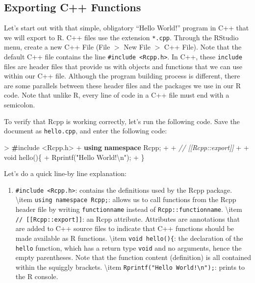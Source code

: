 \documentclass[]{krantz}
\makeatletter
\newenvironment{Shaded}{\begin{snugshade}}{\end{snugshade}}
\newcommand{\KeywordTok}[1]{\textcolor[rgb]{0.27,0.27,0.27}{\textbf{#1}}}
\newcommand{\DataTypeTok}[1]{\textcolor[rgb]{0.27,0.27,0.27}{#1}}
\newcommand{\SpecialCharTok}[1]{\textcolor[rgb]{0,0,0}{#1}}
\newcommand{\StringTok}[1]{\textcolor[rgb]{0.5,0.5,0.5}{#1}}
\newcommand{\CommentTok}[1]{\textcolor[rgb]{0.37,0.37,0.37}{\textit{#1}}}
\newcommand{\ErrorTok}[1]{\textcolor[rgb]{0.14,0.14,0.14}{\textbf{#1}}}
\newcommand{\NormalTok}[1]{#1}
\providecommand{\tightlist}{%
  \setlength{\itemsep}{0pt}\setlength{\parskip}{0pt}}
\newenvironment{kframe}{%
\medskip{}
\setlength{\fboxsep}{.8em}
 \def\at@end@of@kframe{}%
 \ifinner\ifhmode%
  \def\at@end@of@kframe{\end{minipage}}%
  \begin{minipage}{\columnwidth}%
 \fi\fi%
 \def\FrameCommand##1{\hskip\@totalleftmargin \hskip-\fboxsep
 \colorbox{shadecolor}{##1}\hskip-\fboxsep
     \hskip-\linewidth \hskip-\@totalleftmargin \hskip\columnwidth}%
 \MakeFramed {\advance\hsize-\width
   \@totalleftmargin\z@ \linewidth\hsize
   \@setminipage}}%
 {\par\unskip\endMakeFramed%
 \at@end@of@kframe}
\renewenvironment{Shaded}{\begin{kframe}}{\end{kframe}}
\makeatother
\begin{document}
\subsection{Exporting C++ Functions}\label{exporting-c-functions}

Let's start out with that simple, obligatory ``Hello World!'' program in
C++ that we will export to R. C++ files use the extension
\texttt{*.cpp}. Through the RStudio menu, create a new C++ File (File
\(>\) New File \(>\) C++ File). Note that the default C++ file contains
the line \texttt{\#include\ \textless{}Rcpp.h\textgreater{}}. In C++,
these \texttt{include} files are header files that provide us with
objects and functions that we can use within our C++ file. Although the
program building process is different, there are some parallels between
these header files and the packages we use in our R code. Note that
unlike R, every line of code in a C++ file must end with a semicolon.

To verify that Rcpp is working correctly, let's run the following code.
Save the document as \texttt{hello.cpp}, and enter the following code:

\begin{Shaded}
\begin{Highlighting}[]
\NormalTok{> }\ErrorTok{#}\NormalTok{include <Rcpp.h>}
\NormalTok{+ }\KeywordTok{using} \KeywordTok{namespace}\NormalTok{ Rcpp;}
\NormalTok{+ }
\NormalTok{+ }\CommentTok{// [[Rcpp::export]]}
\NormalTok{+ }
\NormalTok{+ }\DataTypeTok{void}\NormalTok{ hello()\{}
\NormalTok{+   Rprintf(}\StringTok{"Hello World!}\SpecialCharTok{\textbackslash{}n}\StringTok{"}\NormalTok{);}
\NormalTok{+ \}}
\end{Highlighting}
\end{Shaded}

Let's do a quick line-by line explanation:

\begin{enumerate}
\def\labelenumi{\arabic{enumi}.}
\tightlist
\item
  \texttt{\#include\ \textless{}Rcpp.h\textgreater{}}: contains the
  definitions used by the Rcpp package. \textbackslash{}item
  \texttt{using\ namespace\ Rcpp;}: allows us to call functions from the
  Rcpp header file by writing \texttt{functionname} instead of
  \texttt{Rcpp::functionname}. \textbackslash{}item
  \texttt{//\ {[}{[}Rcpp::export{]}{]}}: an Rcpp attribute. Attributes
  are annotations that are added to C++ source files to indicate that
  C++ functions should be made available as R functions.
  \textbackslash{}item \texttt{void\ hello()\{}: the declaration of the
  \texttt{hello} function, which has a return type \texttt{void} and no
  arguments, hence the empty parentheses. Note that the function content
  (definition) is all contained within the squiggly brackets.
  \textbackslash{}item
  \texttt{Rprintf("Hello\ World!\textbackslash{}n");}: prints to the R
  console.
\end{enumerate}
\end{document}
